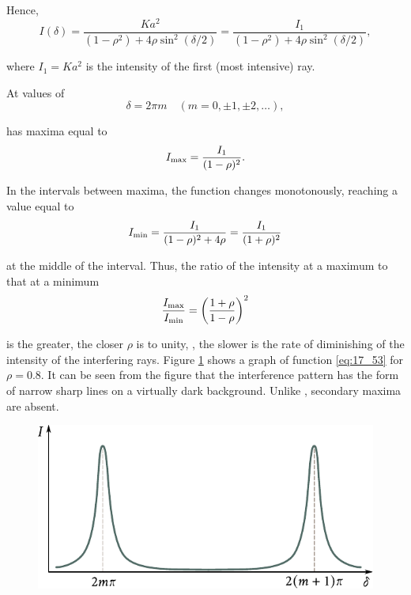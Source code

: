 \noindent
Hence,
\begin{equation}\label{eq:17_53}
    I(\delta) = \frac{Ka^2}{(1-\rho^2) + 4\rho\sin^2(\delta/2)} = \frac{I_1}{(1-\rho^2) + 4\rho\sin^2(\delta/2)},
\end{equation}

\noindent
where $I_1=Ka^2$ is the intensity of the first (most intensive) ray.

At values of
\begin{equation}\label{eq:17_54}
    \delta = 2 \pi m \quad (m = 0, \pm 1, \pm 2, \ldots),
\end{equation}

\noindent
{} has maxima equal to
\begin{equation}\label{eq:17_55}
    I_{\text{max}} = \frac{I_1}{(1-\rho)^2}.
\end{equation}

\noindent
In the intervals between maxima, the function changes monotonously, reaching a value equal to
\begin{equation}\label{eq:17_56}
    I_{\text{min}} = \frac{I_1}{(1-\rho)^2 + 4\rho} = \frac{I_1}{(1+\rho)^2}
\end{equation}

\noindent
at the middle of the interval.
Thus, the ratio of the intensity at a maximum to that at a minimum
\begin{equation}\label{eq:17_57}
    \frac{I_{\text{max}}}{I_{\text{min}}} = \left(\frac{1+\rho}{1-\rho}\right)^2
\end{equation}

\noindent
is the greater, the closer $\rho$ is to unity, \ie, the slower is the rate of diminishing of the intensity of the interfering rays.
Figure \ref{fig:17_19} shows a graph of function \eqref{eq:17_53} for $\rho=0.8$.
It can be seen from the figure that the interference pattern has the form of narrow sharp
lines on a virtually dark background.
Unlike , secondary maxima are absent.

\begin{figure}[t]
	\begin{center}
		\includegraphics[scale=0.95]{figures/ch_17/fig_17_19.pdf}
		\caption[]{}
		\label{fig:17_19}
	\end{center}
	\vspace{-0.85cm}
\end{figure}

